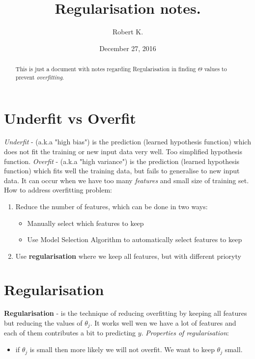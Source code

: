 \documentclass{article}
\author{Robert K.}
\title{Regularisation notes.}
\date{December 27, 2016}
\begin{document}
\maketitle
\begin{abstract}
This is just a document with notes regarding Regularisation in finding $\Theta$ values to prevent \textit{overfitting}.
\end{abstract}

\section{Underfit vs Overfit}
\textit{Underfit} - (a.k.a "high bias") is the prediction (learned hypothesis function) which does not fit the training or new input data very well. Too simplified hypothesis function. 
\newline
\textit{Overfit} - (a.k.a "high variance") is the prediction (learned hypothesis function) which fits well the training data, but fails to generalise to new input data. It can occur when we have too many \textit{features} and small size of training set. 
\newline
\newline
How to address overfitting problem:
\begin{enumerate}
	\item Reduce the number of features, which can be done in two ways:
		\begin{itemize}
			\item Manually select which features to keep
			\item Use Model Selection Algorithm to automatically select features to keep
		\end{itemize}
	\item Use \textbf{regularisation} where we keep all features, but with different prioryty
\end{enumerate}


\section{Regularisation}
\textbf{Regularisation} - is the technique of reducing overfitting by keeping all features but reducing the values of $\theta_j$.
\newline
It works well wen we have a lot of features and each of them contributes a bit to predicting $y$.
\newline 
\newline
\textit{Properties of regularisation}: 
\begin{itemize}
\item if $\theta_j$ is small then more likely we will not overfit. We want to keep $\theta_j$ small.
\end{itemize}
\end{document}
